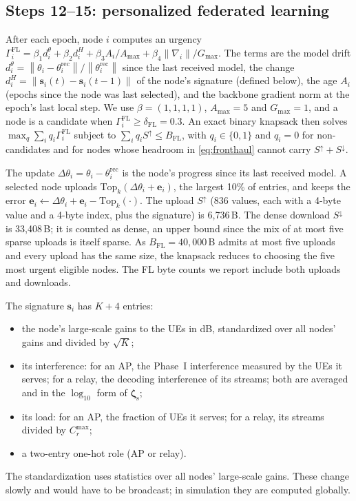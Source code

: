 \documentclass[conference]{IEEEtran}
\newcommand{\norm}[1]{\left\lVert #1 \right\rVert}
\newcommand{\zs}{\boldsymbol{\zeta}_{\mathrm{s}}}
\begin{document}
\subsection{Steps 12--15: personalized federated learning}
After each epoch, node $i$ computes an urgency
$\Gamma^{\mathrm{FL}}_i = \beta_1 d^{\theta}_i + \beta_2 d^{H}_i
+ \beta_3 A_i/A_{\max} + \beta_4 \norm{\nabla_i}/G_{\max}$. The terms are the
model drift
$d^\theta_i = \norm{\theta_i-\theta_i^{\mathrm{rec}}}/\norm{\theta_i^{\mathrm{rec}}}$
since the last received model, the change $d^H_i =
\norm{\mathbf{s}_i(t)-\mathbf{s}_i(t-1)}$ of the node's signature (defined
below), the age $A_i$ (epochs since the node was last selected), and the
backbone gradient norm at the epoch's last local step. We use $\beta =
(1,1,1,1)$, $A_{\max}=5$ and $G_{\max}=1$, and a node is a candidate when
$\Gamma^{\mathrm{FL}}_i\ge\delta_{\mathrm{FL}}=0.3$. An exact binary knapsack
then solves
$\max_{q}\sum_i q_i\Gamma^{\mathrm{FL}}_i$ subject to $\sum_i q_i S^{\uparrow}
\le B_{\mathrm{FL}}$, with $q_i\in\{0,1\}$ and $q_i=0$ for non-candidates and
for nodes whose headroom in \eqref{eq:fronthaul} cannot carry
$S^{\uparrow}+S^{\downarrow}$.

The update $\Delta\theta_i = \theta_i-\theta_i^{\mathrm{rec}}$ is the node's
progress since its last received model. A selected node uploads
$\mathrm{Top}_k(\Delta\theta_i+\mathbf{e}_i)$, the largest 10\% of entries,
and keeps the error
$\mathbf{e}_i\leftarrow\Delta\theta_i+\mathbf{e}_i-\mathrm{Top}_k(\cdot)$.
The upload $S^{\uparrow}$ (836 values, each with a 4-byte value and a 4-byte
index, plus the signature) is 6{,}736\,B. The dense download $S^{\downarrow}$
is 33{,}408\,B; it is counted as dense, an upper bound since the mix of at
most five sparse uploads is itself sparse. As $B_{\mathrm{FL}}=40{,}000$\,B
admits at most five uploads and every upload has the same size, the knapsack
reduces to choosing the five most urgent eligible nodes. The FL byte counts
we report include both uploads and downloads.

The signature $\mathbf{s}_i$ has $K+4$ entries:
\begin{itemize}
  \item the node's large-scale gains to the UEs in dB, standardized over all
    nodes' gains and divided by $\sqrt K$;
  \item its interference: for an AP, the Phase~I interference measured by the
    UEs it serves; for a relay, the decoding interference of its streams;
    both are averaged and in the $\log_{10}$ form of $\zs$;
  \item its load: for an AP, the fraction of UEs it serves; for a relay, its
    streams divided by $C_r^{\max}$;
  \item a two-entry one-hot role (AP or relay).
\end{itemize}
The standardization uses statistics over all nodes' large-scale gains. These
change slowly and would have to be broadcast; in simulation they are
computed globally.
\end{document}
